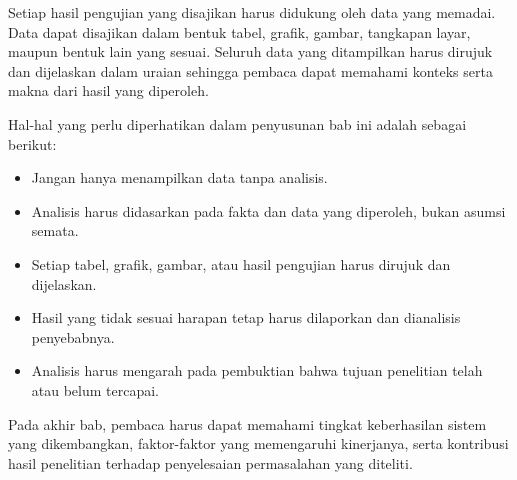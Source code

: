 Setiap hasil pengujian yang disajikan harus didukung oleh data yang memadai. Data dapat disajikan dalam bentuk tabel, grafik, gambar, tangkapan layar, maupun bentuk lain yang sesuai. Seluruh data yang ditampilkan harus dirujuk dan dijelaskan dalam uraian sehingga pembaca dapat memahami konteks serta makna dari hasil yang diperoleh.

Hal-hal yang perlu diperhatikan dalam penyusunan bab ini adalah sebagai berikut:

\begin{itemize}[topsep=0pt,itemsep=0pt,parsep=0pt,leftmargin=*]
\item Jangan hanya menampilkan data tanpa analisis.
\item Analisis harus didasarkan pada fakta dan data yang diperoleh, bukan asumsi semata.
\item Setiap tabel, grafik, gambar, atau hasil pengujian harus dirujuk dan dijelaskan.
\item Hasil yang tidak sesuai harapan tetap harus dilaporkan dan dianalisis penyebabnya.
\item Analisis harus mengarah pada pembuktian bahwa tujuan penelitian telah atau belum tercapai.
\end{itemize}

Pada akhir bab, pembaca harus dapat memahami tingkat keberhasilan sistem yang dikembangkan, faktor-faktor yang memengaruhi kinerjanya, serta kontribusi hasil penelitian terhadap penyelesaian permasalahan yang diteliti.
